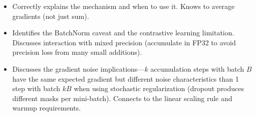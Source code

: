 \begin{interviewq}

\goodgreat
\begin{itemize}
    \item {} Correctly explains the mechanism and when to use it. Knows to average gradients (not just sum).
    \item {} Identifies the BatchNorm caveat and the contrastive learning limitation. Discusses interaction with mixed precision (accumulate in FP32 to avoid precision loss from many small additions).
    \item {} Discusses the gradient noise implications---$k$ accumulation steps with batch $B$ have the same expected gradient but different noise characteristics than 1 step with batch $kB$ when using stochastic regularization (dropout produces different masks per mini-batch). Connects to the linear scaling rule and warmup requirements.
\end{itemize}

\end{interviewq}

